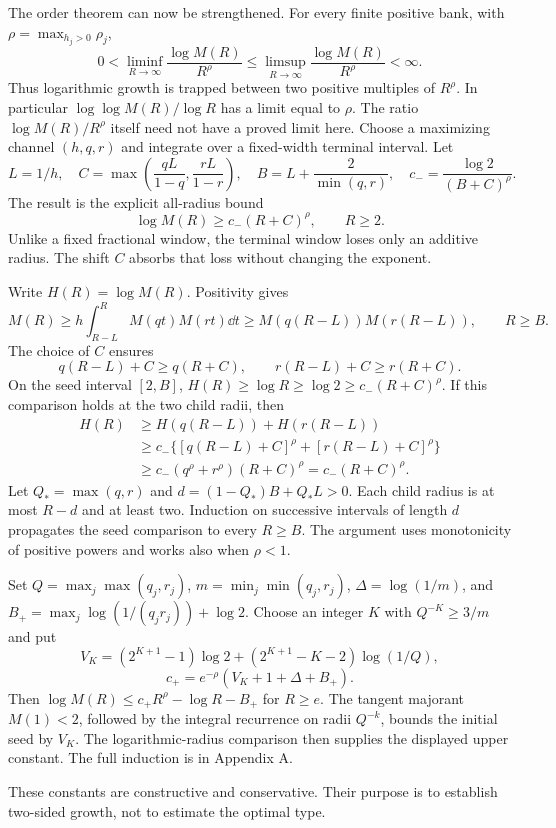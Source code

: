 The order theorem can now be strengthened. For every finite positive bank,
with $\rho=\max_{h_j>0}\rho_j$,
\[
\boxed{0<\liminf_{R\to\infty}\frac{\log M(R)}{R^\rho}
\le\limsup_{R\to\infty}\frac{\log M(R)}{R^\rho}<\infty.}
\]
Thus logarithmic growth is trapped between two positive multiples of
$R^\rho$. In particular $\log\log M(R)/\log R$ has a limit equal to $\rho$.
The ratio $\log M(R)/R^\rho$ itself need not have a proved limit here.
Choose a maximizing channel $(h,q,r)$ and integrate over a fixed-width
terminal interval. Let
\[
L=1/h,\quad C=\max\left(\frac{qL}{1-q},\frac{rL}{1-r}\right),\quad
B=L+\frac{2}{\min(q,r)},\quad c_-=\frac{\log2}{(B+C)^\rho}.
\]
The result is the explicit all-radius bound
\[
\log M(R)\ge c_-(R+C)^\rho,\qquad R\ge2.
\]
Unlike a fixed fractional window, the terminal window loses only an additive
radius. The shift $C$ absorbs that loss without changing the exponent.

Write $H(R)=\log M(R)$. Positivity gives
\[
M(R)\ge h\int_{R-L}^{R}M(qt)M(rt)\dd t
\ge M(q(R-L))M(r(R-L)),\qquad R\ge B.
\]
The choice of $C$ ensures
\[
q(R-L)+C\ge q(R+C),\qquad r(R-L)+C\ge r(R+C).
\]
On the seed interval $[2,B]$, $H(R)\ge\log R\ge\log2\ge c_-(R+C)^\rho$.
If this comparison holds at the two child radii, then
\[
\begin{aligned}
H(R)&\ge H(q(R-L))+H(r(R-L))\\
&\ge c_-\{[q(R-L)+C]^\rho+[r(R-L)+C]^\rho\}\\
&\ge c_-(q^\rho+r^\rho)(R+C)^\rho=c_-(R+C)^\rho.
\end{aligned}
\]
Let $Q_* =\max(q,r)$ and $d=(1-Q_*)B+Q_*L>0$. Each child radius is at
most $R-d$ and at least two. Induction on successive intervals of length
$d$ propagates the seed comparison to every $R\ge B$. The argument uses
monotonicity of positive powers and works also when $\rho<1$.

Set $Q=\max_j\max(q_j,r_j)$, $m=\min_j\min(q_j,r_j)$,
$\Delta=\log(1/m)$, and $B_+=\max_j\log(1/(q_jr_j))+\log2$.
Choose an integer $K$ with $Q^{-K}\ge3/m$ and put
\[
V_K=(2^{K+1}-1)\log2+(2^{K+1}-K-2)\log(1/Q),
\]
\[
c_+=e^{-\rho}(V_K+1+\Delta+B_+).
\]
Then $\log M(R)\le c_+R^\rho-\log R-B_+$ for $R\ge e$.
The tangent majorant $M(1)<2$, followed by the integral recurrence on radii
$Q^{-k}$, bounds the initial seed by $V_K$. The logarithmic-radius comparison
then supplies the displayed upper constant. The full induction is in Appendix A.

These constants are constructive and conservative. Their purpose is to
establish two-sided growth, not to estimate the optimal type.

